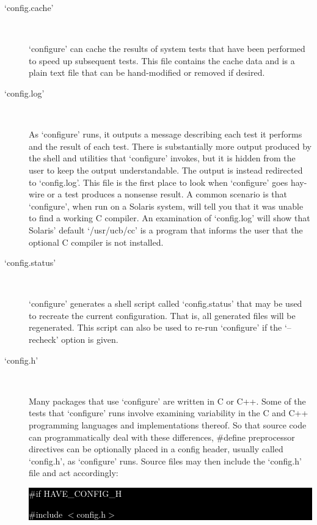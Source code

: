 \begin{description} 

\item[`config.cache']
\ %

`configure' can cache the results of system tests that have been performed to speed up subsequent tests. This file contains the cache data and is a plain text file that can be hand-modified or removed if desired. 

\item[`config.log']
\ %

As `configure' runs, it outputs a message describing each test it performs and the result of each test. There is substantially more output produced by the shell and utilities that `configure' invokes, but it is hidden from the user to keep the output understandable. The output is instead redirected to `config.log'. This file is the first place to look when `configure' goes hay-wire or a test produces a nonsense result. A common scenario is that `configure', when run on a Solaris system, will tell you that it was unable to find a working C compiler. An examination of `config.log' will show that Solaris' default `/usr/ucb/cc' is a program that informs the user that the optional C compiler is not installed. 

\item[`config.status']
\ %

`configure' generates a shell script called `config.status' that may be used to recreate the current configuration. That is, all generated files will be regenerated. This script can also be used to re-run `configure' if the `--recheck' option is given. 

\item[`config.h']
\ %

Many packages that use `configure' are written in C or C++. Some of the 
tests that `configure' runs involve examining variability in the C and 
C++ programming languages and implementations thereof. So that source code 
can programmatically deal with these differences, \#define preprocessor 
directives can be optionally placed in a config header, usually 
called `config.h', as `configure' runs. Source files may then include 
the `config.h' file and act accordingly:

\bigskip
\colorbox{black}{\begin{minipage}{12cm}
  \textcolor{white}{\#if HAVE\_{}CONFIG\_{}H}

  \textcolor{white}{\#include $<$config.h$>$}


\end{minipage}}
\end{description}

